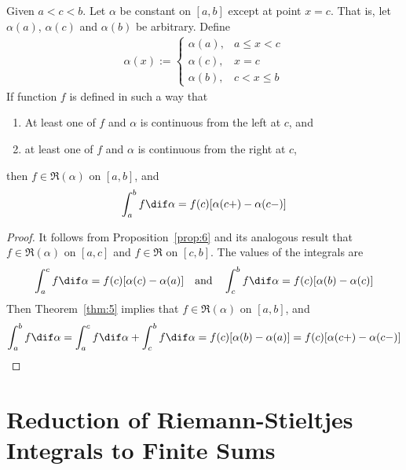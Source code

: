\documentclass[thmcnt=section, color=blue, 12pt]{my-elegantbook}
\begin{document}
\begin{theorem} \label{thm:6}
	Given $a < c <b$.
	Let $\alpha$ be constant on $[a, b]$ except at point $x=c$.
	That is, let $\alpha(a)$, $\alpha(c)$ and $\alpha(b)$ be arbitrary.
	Define
	\begin{align*}
		\alpha(x) := \begin{cases}
			             \alpha(a), & a \leq x < c \\
			             \alpha(c), & x=c          \\
			             \alpha(b), & c < x \leq b
		             \end{cases}
	\end{align*}
	If function $f$ is defined in such a way that
	\begin{enumerate}
		\item At least one of $f$ and $\alpha$ is continuous from the left at $c$, and
		\item at least one of $f$ and $\alpha$ is continuous from the right at $c$,
	\end{enumerate}
	then $f \in \mathfrak{R}(\alpha)$ on $[a, b]$, and
	\begin{align*}
		\int_a^b f \dif \alpha = f(c)[\alpha(c+) - \alpha(c-)]
	\end{align*}
\end{theorem}

\begin{proof}
	It follows from Proposition~\ref{prop:6} and its analogous result
	that $f \in \mathfrak{R}(\alpha)$ on $[a, c]$
	and $f \in \mathfrak{R}$ on $[c, b]$.
	The values of the integrals are
	\begin{align*}
		\int_a^c f \dif \alpha = f(c)[\alpha(c) - \alpha(a)]
		\quad \text{and} \quad
		\int_c^b f \dif \alpha = f(c)[\alpha(b) - \alpha(c)]
	\end{align*}
	Then Theorem~\ref{thm:5} implies
	that $f \in \mathfrak{R}(\alpha)$ on $[a, b]$, and
	\begin{align*}
		\int_a^b f \dif \alpha
		= \int_a^c f \dif \alpha + \int_c^b f \dif \alpha
		= f(c)[\alpha(b) - \alpha(a)]
		= f(c)[\alpha(c+) - \alpha(c-)]
	\end{align*}
\end{proof}



\section{Reduction of Riemann-Stieltjes Integrals to Finite Sums}
\end{document}
